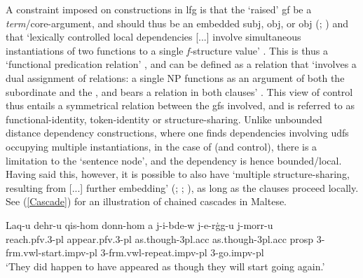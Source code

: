 \documentclass[output=paper]{LSP/langsci}
\begin{document}
A constraint imposed on  constructions in {\sc lfg} is that the `raised' {\sc gf} be a \emph{term}/core-argument, and should thus be an embedded {\sc subj}, {\sc obj}, or {\sc obj}{\texttheta} (; ) and that `lexically controlled local dependencies [...] involve simultaneous instantiations of two  functions to a single \emph{f-}structure value' . This is thus a `functional predication relation' , and can be defined as a relation that `involves a dual assignment of  relations: a single NP functions as an argument of both the subordinate  and the , and bears a  relation in both clauses' . This view of control thus entails a symmetrical relation between the {\sc gf}s involved, and is referred to as functional-identity, token-identity or structure-sharing. Unlike unbounded distance dependency constructions, where one finds dependencies involving {\sc udf}s occupying multiple instantiations, in the case of  (and control), there is a limitation to the `sentence node', and the dependency is hence bounded/local. Having said this, however, it is possible to also have `multiple structure-sharing, resulting from [...] further embedding' (; ; ), as long as the clauses proceed locally. See (\ref{Cascade}) for an illustration of chained  cascades in Maltese.

\ea \label{Cascade}
\gll La\textcrh q-u dehr-u qis-hom donn-hom \textcrh a j-i-bde-w j-e-r{\.g}g\textcrh-u j-morr-u{\footnotemark}\\
reach.{\sc pfv.3-pl} appear.{\sc pfv.3-pl} as.though-{\sc 3pl.acc} as.though-{\sc 3pl.acc} {\sc prosp} 3-{\sc frm.vwl}-start.{\sc impv-pl} 3-{\sc frm.vwl}-repeat.{\sc impv-pl} 3-go.{\sc impv-pl}\\
\glt `They did happen to have appeared as though they will start going again.'
\z
\end{document}
